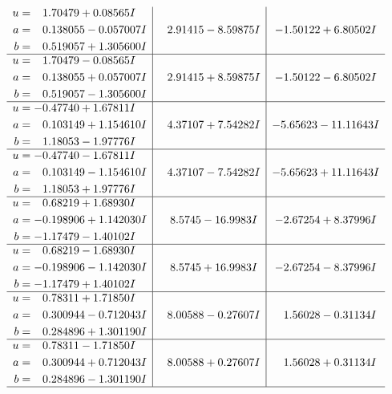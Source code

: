 \documentclass[1p]{elsarticle_modified}
\theoremstyle{definition}
\begin{document}
$$\begin{array}{c|c|c}
\begin{aligned}
u &= \phantom{-}1.70479 + 0.08565 I \\
a &= \phantom{-}0.138055 - 0.057007 I \\
b &= \phantom{-}0.519057 + 1.305600 I\end{aligned}
 & \phantom{-}2.91415 - 8.59875 I & -1.50122 + 6.80502 I \\ \hline\begin{aligned}
u &= \phantom{-}1.70479 - 0.08565 I \\
a &= \phantom{-}0.138055 + 0.057007 I \\
b &= \phantom{-}0.519057 - 1.305600 I\end{aligned}
 & \phantom{-}2.91415 + 8.59875 I & -1.50122 - 6.80502 I \\ \hline\begin{aligned}
u &= -0.47740 + 1.67811 I \\
a &= \phantom{-}0.103149 + 1.154610 I \\
b &= \phantom{-}1.18053 - 1.97776 I\end{aligned}
 & \phantom{-}4.37107 + 7.54282 I & -5.65623 - 11.11643 I \\ \hline\begin{aligned}
u &= -0.47740 - 1.67811 I \\
a &= \phantom{-}0.103149 - 1.154610 I \\
b &= \phantom{-}1.18053 + 1.97776 I\end{aligned}
 & \phantom{-}4.37107 - 7.54282 I & -5.65623 + 11.11643 I \\ \hline\begin{aligned}
u &= \phantom{-}0.68219 + 1.68930 I \\
a &= -0.198906 + 1.142030 I \\
b &= -1.17479 - 1.40102 I\end{aligned}
 & \phantom{-}8.5745 - 16.9983 I & -2.67254 + 8.37996 I \\ \hline\begin{aligned}
u &= \phantom{-}0.68219 - 1.68930 I \\
a &= -0.198906 - 1.142030 I \\
b &= -1.17479 + 1.40102 I\end{aligned}
 & \phantom{-}8.5745 + 16.9983 I & -2.67254 - 8.37996 I \\ \hline\begin{aligned}
u &= \phantom{-}0.78311 + 1.71850 I \\
a &= \phantom{-}0.300944 - 0.712043 I \\
b &= \phantom{-}0.284896 + 1.301190 I\end{aligned}
 & \phantom{-}8.00588 - 0.27607 I & \phantom{-}1.56028 - 0.31134 I \\ \hline\begin{aligned}
u &= \phantom{-}0.78311 - 1.71850 I \\
a &= \phantom{-}0.300944 + 0.712043 I \\
b &= \phantom{-}0.284896 - 1.301190 I\end{aligned}
 & \phantom{-}8.00588 + 0.27607 I & \phantom{-}1.56028 + 0.31134 I\\
 \hline 
 \end{array}$$\newpage\newpage\renewcommand{\arraystretch}{1}
\end{document}
